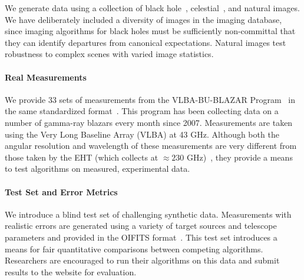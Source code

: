 We generate data using a collection of black hole~\cite{avery}, celestial~\cite{jpl, nrao}, and natural images. 
We have deliberately included a diversity of images in the imaging database, since imaging algorithms for black holes must be sufficiently non-committal that they can identify departures from canonical expectations. %
Natural images test robustness to complex scenes with varied image statistics.

\paragraph{Real Measurements} We provide 33 sets of measurements from the VLBA-BU-BLAZAR Program~\cite{jorstad2005polarimetric} in the same standardized format~\cite{ pauls2005data}. 
This program has been collecting data on a number of gamma-ray blazars every month since 2007. 
Measurements are taken using the Very Long Baseline Array (VLBA) at 43 GHz. Although both the angular resolution and wavelength of these measurements are very different from those taken by the EHT (which collects at $\approx 230$ GHz)~\cite{fish2014imaging}, they provide a means to test algorithms on measured, experimental data. 

\paragraph{Test Set and Error Metrics}

We introduce a blind test set of
challenging synthetic data. %
Measurements with realistic errors are generated using a variety of target sources and telescope parameters and provided in the OIFITS format~\cite{pauls2005data}.
This test set introduces a means for fair quantitative comparisons between competing algorithms. Researchers are encouraged to run their algorithms on this data and submit results to the website for evaluation. 


